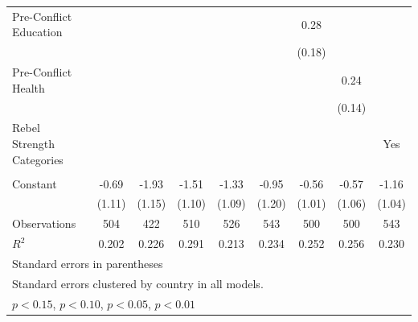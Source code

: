 \documentclass[12pt, letterpaper]{article}
\begin{document}
\begin{table}[htbp]
\begin{small}
\begin{tabular}{l*{8}{c}}
Pre-Conflict Education&                     &                     &                     &                     &                     &        0.28\sym{+}  &                     &                     \\
                    &                     &                     &                     &                     &                     &      (0.18)         &                     &                     \\
Pre-Conflict Health &                     &                     &                     &                     &                     &                     &        0.24\sym{*}  &                     \\
                    &                     &                     &                     &                     &                     &                     &      (0.14)         &                     \\
Rebel Strength Categories         &                     &                     &                     &                     &                     &                     &                     &        Yes         \\
                    &                     &                     &                     &                     &                     &                     &                     &\\
Constant            &       -0.69         &       -1.93\sym{+}  &       -1.51         &       -1.33         &       -0.95         &       -0.56         &       -0.57         &       -1.16         \\
                    &      (1.11)         &      (1.15)         &      (1.10)         &      (1.09)         &      (1.20)         &      (1.01)         &      (1.06)         &      (1.04)         \\
\hline
Observations        &         504         &         422         &         510         &         526         &         543         &         500         &         500         &         543         \\
\(R^{2}\)           &       0.202         &       0.226         &       0.291         &       0.213         &       0.234         &       0.252         &       0.256         &       0.230         \\
\hline\hline
\multicolumn{9}{l}{\footnotesize Standard errors in parentheses}\\
\multicolumn{9}{l}{\footnotesize Standard errors clustered by country in all models.}\\
\multicolumn{9}{l}{\footnotesize \sym{+} \(p<0.15\), \sym{*} \(p<0.10\), \sym{**} \(p<0.05\), \sym{***} \(p<0.01\)}\\
\end{tabular}
\end{small}
\end{table}
\end{document}
